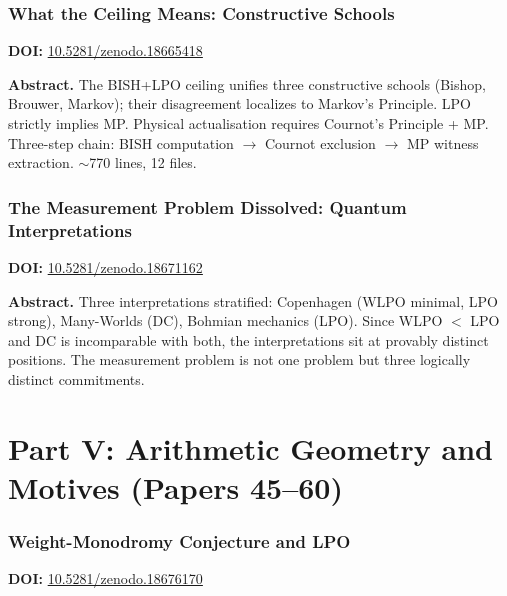 \documentclass[11pt,a4paper]{article}
\begin{document}
\section{What the Ceiling Means: Constructive Schools}
\label{sec:p43}
\textbf{DOI:} \href{https://doi.org/10.5281/zenodo.18665418}{10.5281/zenodo.18665418}

\bigskip
\noindent\textbf{Abstract.}
The BISH+LPO ceiling unifies three constructive schools (Bishop, Brouwer, Markov); their disagreement localizes to Markov's Principle. LPO strictly implies MP. Physical actualisation requires Cournot's Principle + MP. Three-step chain: BISH computation $\to$ Cournot exclusion $\to$ MP witness extraction. $\sim$770 lines, 12 files.

\section{The Measurement Problem Dissolved: Quantum Interpretations}
\label{sec:p44}
\textbf{DOI:} \href{https://doi.org/10.5281/zenodo.18671162}{10.5281/zenodo.18671162}

\bigskip
\noindent\textbf{Abstract.}
Three interpretations stratified: Copenhagen (WLPO minimal, LPO strong), Many-Worlds (DC), Bohmian mechanics (LPO). Since WLPO $<$ LPO and DC is incomparable with both, the interpretations sit at provably distinct positions. The measurement problem is not one problem but three logically distinct commitments.


\newpage
\part*{Part V: Arithmetic Geometry and Motives (Papers 45--60)}

\section{Weight-Monodromy Conjecture and LPO}
\label{sec:p45}
\textbf{DOI:} \href{https://doi.org/10.5281/zenodo.18676170}{10.5281/zenodo.18676170}
\end{document}
